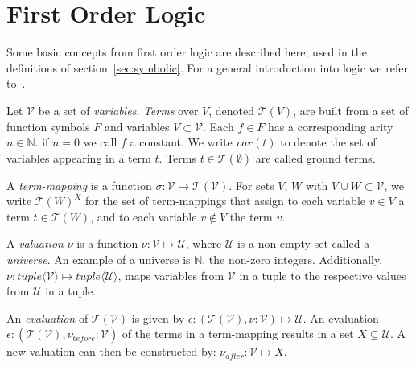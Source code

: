 \section{First Order Logic}\label{sec:first_order_logic}

Some basic concepts from first order logic are described here, used in the definitions of section~\ref{sec:symbolic}. For a general introduction into logic we refer to~\cite{Huth:logic}.
 
Let $\mathcal{V}$ be a set of \textit{variables}. \textit{Terms} over $V$, denoted $\mathcal{T}(V)$, are built from a set of function symbols $F$ and variables $V \subset \mathcal{V}$. Each $f\in F$ has a corresponding arity $n\in \mathbb{N}$. if $n = 0$ we call $f$ a constant. We write $var(t)$ to denote the set of variables appearing in a term $t$. Terms $t\in \mathcal{T}(\emptyset)$ are called ground terms.

A \textit{term-mapping} is a function $\sigma:\mathcal{V} \mapsto \mathcal{T}(\mathcal{V})$. For sets $V$, $W$ with $V \cup W \subset \mathcal{V}$, we write $\mathcal{T}(W)^X$ for the set of term-mappings that assign to each variable $v\in V$ a term $t\in \mathcal{T}(W)$, and to each variable $v \not\in V$ the term $v$.

A \textit{valuation} $\nu$ is a function $\nu:\mathcal{V} \mapsto \mathcal{U}$, where $\mathcal{U}$ is a non-empty set called a \textit{universe}. An example of a universe is $\mathbb{N}$, the non-zero integers. Additionally, $\nu:\mathit{tuple}\langle\mathcal{V}\rangle \mapsto \mathit{tuple}\langle\mathcal{U}\rangle$, maps variables from $\mathcal{V}$ in a tuple to the respective values from $\mathcal{U}$ in a tuple.

An \textit{evaluation} of $\mathcal{T}(\mathcal{V})$ is given by $\epsilon:(\mathcal{T}(\mathcal{V}),\nu:\mathcal{V}) \mapsto \mathcal{U}$. An evaluation $\epsilon:(\mathcal{T}(\mathcal{V}),\nu_\mathit{before}:\mathcal{V})$ of the terms in a term-mapping results in a set $X \subseteq \mathcal{U}$. A new valuation can then be constructed by: $\nu_\mathit{after}:\mathcal{V} \mapsto X$.

